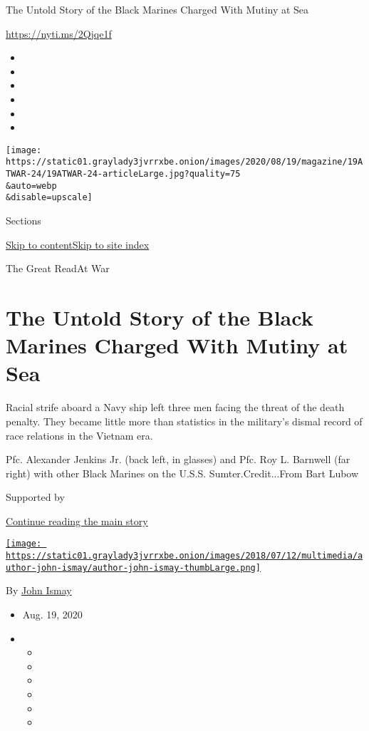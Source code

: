 The Untold Story of the Black Marines Charged With Mutiny at Sea

\url{https://nyti.ms/2Qjqe1f}

\begin{itemize}
\item
\item
\item
\item
\item
\item
\end{itemize}

\texttt{[image: https://static01.graylady3jvrrxbe.onion/images/2020/08/19/magazine/19ATWAR-24/19ATWAR-24-articleLarge.jpg?quality=75\\\&auto=webp\\\&disable=upscale]}

Sections

\protect\hyperlink{site-content}{Skip to
content}\protect\hyperlink{site-index}{Skip to site index}

The Great ReadAt War

\hypertarget{the-untold-story-of-the-black-marines-charged-with-mutiny-at-sea}{%
\section{The Untold Story of the Black Marines Charged With Mutiny at
Sea}\label{the-untold-story-of-the-black-marines-charged-with-mutiny-at-sea}}

Racial strife aboard a Navy ship left three men facing the threat of the
death penalty. They became little more than statistics in the military's
dismal record of race relations in the Vietnam era.

Pfc. Alexander Jenkins Jr. (back left, in glasses) and Pfc. Roy L.
Barnwell (far right) with other Black Marines on the U.S.S.
Sumter.Credit...From Bart Lubow

Supported by

\protect\hyperlink{after-sponsor}{Continue reading the main story}

\href{https://www.nytimes3xbfgragh.onion/by/john-ismay}{\texttt{[image: https://static01.graylady3jvrrxbe.onion/images/2018/07/12/multimedia/author-john-ismay/author-john-ismay-thumbLarge.png]}}

By \href{https://www.nytimes3xbfgragh.onion/by/john-ismay}{John Ismay}

\begin{itemize}
\item
  Aug. 19, 2020
\item
  \begin{itemize}
  \item
  \item
  \item
  \item
  \item
  \item
  \end{itemize}
\end{itemize}


